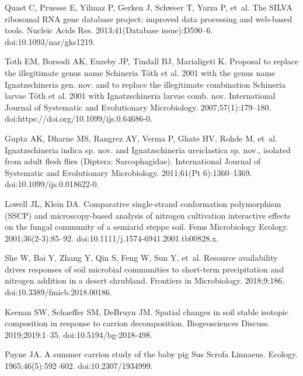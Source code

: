 \documentclass[
  10pt,
  letterpaper,
]{article}
\begin{document}
\begin{thebibliography}{10}
    Quast C, Pruesse E, Yilmaz P, Gerken J, Schweer T, Yarza P, et~al.
    \newblock The {SILVA} ribosomal {RNA} gene database project: improved data processing and web-based tools.
    \newblock Nucleic Acids Res. 2013;41(Database issue):D590--6.
    \newblock doi:{10.1093/nar/gks1219}.
    
    Toth EM, Borsodi AK, Euzeby JP, Tindall BJ, Marialigeti K.
    \newblock Proposal to replace the illegitimate genus name {Schineria} {Tóth} et al. 2001 with the genus name {Ignatzschineria} gen. nov. and to replace the illegitimate combination {Schineria} larvae {Tóth} et al. 2001 with {Ignatzschineria} larvae comb. nov.
    \newblock International Journal of Systematic and Evolutionary Microbiology. 2007;57(1):179--180.
    \newblock doi:{https://doi.org/10.1099/ijs.0.64686-0}.
    
    Gupta AK, Dharne MS, Rangrez AY, Verma P, Ghate HV, Rohde M, et~al.
    \newblock Ignatzschineria indica sp. nov. and {Ignatzschineria} ureiclastica sp. nov., isolated from adult flesh flies ({Diptera}: {Sarcophagidae}).
    \newblock International Journal of Systematic and Evolutionary Microbiology. 2011;61(Pt 6):1360--1369.
    \newblock doi:{10.1099/ijs.0.018622-0}.
    
    Lowell JL, Klein DA.
    \newblock Comparative single-strand conformation polymorphism ({SSCP}) and microscopy-based analysis of nitrogen cultivation interactive effects on the fungal community of a semiarid steppe soil.
    \newblock Fems Microbiology Ecology. 2001;36(2-3):85--92.
    \newblock doi:{10.1111/j.1574-6941.2001.tb00828.x}.
    
    She W, Bai Y, Zhang Y, Qin S, Feng W, Sun Y, et~al.
    \newblock Resource availability drives responses of soil microbial communities to short-term precipitation and nitrogen addition in a desert shrubland.
    \newblock Frontiers in Microbiology. 2018;9:186.
    \newblock doi:{10.3389/fmicb.2018.00186}.
    
    Keenan SW, Schaeffer SM, DeBruyn JM.
    \newblock Spatial changes in soil stable isotopic composition in response to carrion decomposition.
    \newblock Biogeosciences Discuss. 2019;2019:1--35.
    \newblock doi:{10.5194/bg-2018-498}.
    
    Payne JA.
    \newblock A summer carrion study of the baby pig {Sus} {Scrofa} {Linnaeus}.
    \newblock Ecology. 1965;46(5):592--602.
    \newblock doi:{10.2307/1934999}.
    

\end{thebibliography}
\end{document}

